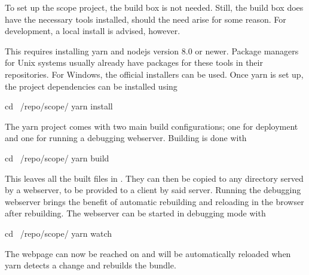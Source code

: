 
To set up the scope project, the build box is not needed. Still, the build box
does  have the  necessary  tools installed,  should the  need  arise for  some
reason.  For development, a local install is advised, however.

This  requires installing  yarn  and  nodejs version  8.0  or newer.   Package
managers for  Unix systems usually  already have  packages for these  tools in
their repositories. For  Windows, the official  installers can be  used.  Once
yarn is set up, the project dependencies can be installed using
\begin{commandshell}
    cd ~/repo/scope/
    yarn install
\end{commandshell}
\noindent The yarn  project comes with two main  build configurations; one for
deployment and one for running a debugging webserver. Building is done with
\begin{commandshell}
    cd ~/repo/scope/
    yarn build
\end{commandshell}

This leaves all the built files in . They can then be
copied to any directory  served by a webserver, to be provided  to a client by
said server.  Running the debugging  webserver brings the benefit of automatic
rebuilding and reloading in the browser after rebuilding. The webserver can be
started in debugging mode with
\begin{commandshell}
    cd ~/repo/scope/
    yarn watch
\end{commandshell}
The webpage  can now  be reached on   and  will be
automatically reloaded when yarn detects a change and rebuilds the bundle.

